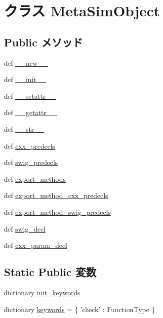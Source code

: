 \hypertarget{classm5_1_1SimObject_1_1MetaSimObject}{
\section{クラス MetaSimObject}
\label{classm5_1_1SimObject_1_1MetaSimObject}
}
\subsection*{Public メソッド}
\begin{DoxyCompactItemize}
\item 
def \hyperlink{classm5_1_1SimObject_1_1MetaSimObject_a2f15a4676204349e06bcced484b06b70}{\_\-\_\-new\_\-\_\-}
\item 
def \hyperlink{classm5_1_1SimObject_1_1MetaSimObject_ac775ee34451fdfa742b318538164070e}{\_\-\_\-init\_\-\_\-}
\item 
def \hyperlink{classm5_1_1SimObject_1_1MetaSimObject_a6287b7a16286568d5442b6e2e90215b5}{\_\-\_\-setattr\_\-\_\-}
\item 
def \hyperlink{classm5_1_1SimObject_1_1MetaSimObject_a0a990b3ec3889d40889daca9ee5e4695}{\_\-\_\-getattr\_\-\_\-}
\item 
def \hyperlink{classm5_1_1SimObject_1_1MetaSimObject_aa7a4b9bc0941308e362738503137460e}{\_\-\_\-str\_\-\_\-}
\item 
def \hyperlink{classm5_1_1SimObject_1_1MetaSimObject_a0b408a11a14bd1d770e28f71a6e14ab5}{cxx\_\-predecls}
\item 
def \hyperlink{classm5_1_1SimObject_1_1MetaSimObject_ab3dbcf5716623eac67a8ccc074fa7e13}{swig\_\-predecls}
\item 
def \hyperlink{classm5_1_1SimObject_1_1MetaSimObject_ab373c5eaef9a7b80491a097389260f4a}{export\_\-methods}
\item 
def \hyperlink{classm5_1_1SimObject_1_1MetaSimObject_a4c94af862ca1bc3ebde2094d5e778ef1}{export\_\-method\_\-cxx\_\-predecls}
\item 
def \hyperlink{classm5_1_1SimObject_1_1MetaSimObject_ac19f60f4d41b7b37c7f282db24e5d743}{export\_\-method\_\-swig\_\-predecls}
\item 
def \hyperlink{classm5_1_1SimObject_1_1MetaSimObject_a83526365333b680bfcbd9b037527cc25}{swig\_\-decl}
\item 
def \hyperlink{classm5_1_1SimObject_1_1MetaSimObject_af533aa789436bfde5727387a36ca9178}{cxx\_\-param\_\-decl}
\end{DoxyCompactItemize}
\subsection*{Static Public 変数}
\begin{DoxyCompactItemize}
\item 
dictionary \hyperlink{classm5_1_1SimObject_1_1MetaSimObject_a608ecb4a2947d6894ab9594d7f59f0a8}{init\_\-keywords}
\item 
dictionary \hyperlink{classm5_1_1SimObject_1_1MetaSimObject_a834325b701200b492fc4d7422529cc70}{keywords} = \{ 'check' : FunctionType \}
\end{DoxyCompactItemize}
